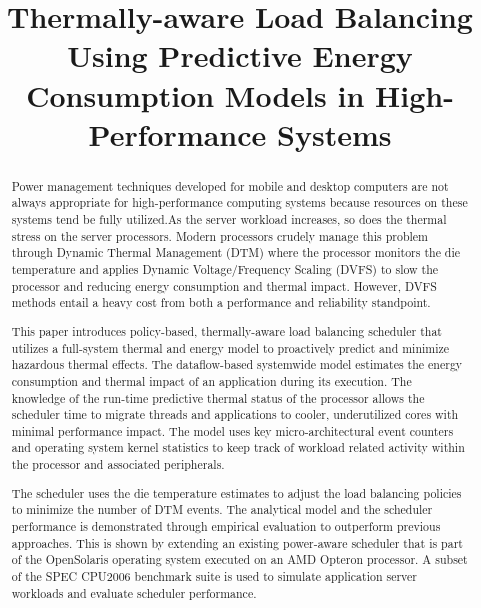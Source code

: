 \title{Thermally-aware Load Balancing Using Predictive Energy
  Consumption Models in High-Performance Systems}
\begin{abstract}
  Power management techniques developed for mobile and desktop computers
  are not always appropriate for high-performance computing systems
  because resources on these systems tend be fully utilized.As the
  server workload increases, so does the thermal stress on the
  server processors.  Modern processors crudely manage this problem
  through Dynamic Thermal Management (DTM) where the processor monitors
  the die temperature and applies Dynamic Voltage/Frequency Scaling
  (DVFS) to slow the processor and reducing energy consumption and
  thermal impact.  However, DVFS methods entail a heavy
  cost from both a performance and reliability standpoint.

  This paper introduces policy-based, thermally-aware load balancing
  scheduler that utilizes a full-system thermal and energy model to
  proactively predict and minimize hazardous thermal effects. The
  dataflow-based systemwide model estimates the energy consumption and
  thermal impact of an application during its execution. The knowledge
  of the run-time predictive thermal status of the processor allows the
  scheduler time to migrate threads and applications to cooler,
  underutilized cores with minimal performance impact. The model uses
  key micro-architectural event counters and operating system kernel
  statistics to keep track of workload related activity within the
  processor and associated peripherals.

  The scheduler uses the die temperature estimates to adjust the load
  balancing policies to minimize the number of DTM events.  The
  analytical model and the scheduler performance is demonstrated through
  empirical evaluation to outperform previous approaches. This is shown
  by extending an existing power-aware scheduler that is part of the
  OpenSolaris operating system executed on an AMD Opteron processor.  A
  subset of the SPEC CPU2006 benchmark suite is used to simulate
  application server workloads and evaluate scheduler performance.
\end{abstract}
